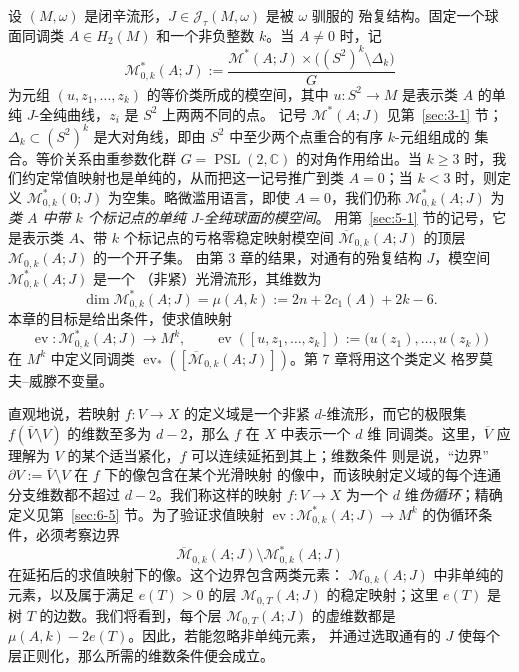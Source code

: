 
设 $(M,\omega)$ 是闭辛流形，$J\in\mathcal J_\tau(M,\omega)$ 是被 $\omega$ 驯服的
殆复结构。固定一个球面同调类 $A\in H_2(M)$ 和一个非负整数 $k$。当 $A\ne0$ 时，记
\[
  \mathcal M^*_{0,k}(A;J)
  :=\frac{\mathcal M^*(A;J)\times\bigl((S^2)^k\setminus\Delta_k\bigr)}{G}
\]
为元组 $(u,z_1,\ldots,z_k)$ 的等价类所成的模空间，其中
$u:S^2\to M$ 是表示类 $A$ 的单纯 $J$-全纯曲线，$z_i$ 是 $S^2$ 上两两不同的点。
记号 $\mathcal M^*(A;J)$ 见第~\ref{sec:3-1} 节；
$\Delta_k\subset(S^2)^k$ 是大对角线，即由 $S^2$ 中至少两个点重合的有序 $k$-元组组成的
集合。等价关系由重参数化群 $G=\operatorname{PSL}(2,\mathbb C)$ 的对角作用给出。当
$k\ge3$ 时，我们约定常值映射也是单纯的，从而把这一记号推广到类 $A=0$；当 $k<3$
时，则定义 $\mathcal M^*_{0,k}(0;J)$ 为空集。略微滥用语言，即使 $A=0$，我们仍称
$\mathcal M^*_{0,k}(A;J)$ 为\emph{类 $A$ 中带 $k$ 个标记点的单纯 $J$-全纯球面的模空间}。
用第~\ref{sec:5-1} 节的记号，它是表示类 $A$、带 $k$ 个标记点的亏格零稳定映射模空间
$\overline{\mathcal M}_{0,k}(A;J)$ 的顶层 $\mathcal M_{0,k}(A;J)$ 的一个开子集。
由第 3 章的结果，对通有的殆复结构 $J$，模空间 $\mathcal M^*_{0,k}(A;J)$ 是一个
（非紧）光滑流形，其维数为
\[
  \dim\mathcal M^*_{0,k}(A;J)
  =\mu(A,k):=2n+2c_1(A)+2k-6.
\]
本章的目标是给出条件，使求值映射
\[
  \operatorname{ev}:\mathcal M^*_{0,k}(A;J)\longrightarrow M^k,
  \qquad
  \operatorname{ev}([u,z_1,\ldots,z_k])
  :=\bigl(u(z_1),\ldots,u(z_k)\bigr)
\]
在 $M^k$ 中定义同调类
$\operatorname{ev}_*([\overline{\mathcal M}_{0,k}(A;J)])$。第 7 章将用这个类定义
格罗莫夫--威滕不变量。

直观地说，若映射 $f:V\to X$ 的定义域是一个非紧 $d$-维流形，而它的极限集
$f(\overline V\setminus V)$ 的维数至多为 $d-2$，那么 $f$ 在 $X$ 中表示一个 $d$ 维
同调类。这里，$\overline V$ 应理解为 $V$ 的某个适当紧化，$f$ 可以连续延拓到其上；维数条件
则是说，“边界” $\partial V:=\overline V\setminus V$ 在 $f$ 下的像包含在某个光滑映射
的像中，而该映射定义域的每个连通分支维数都不超过 $d-2$。我们称这样的映射
$f:V\to X$ 为一个 $d$ 维\emph{伪循环}；精确定义见第~\ref{sec:6-5} 节。为了验证求值映射
$\operatorname{ev}:\mathcal M^*_{0,k}(A;J)\to M^k$ 的伪循环条件，必须考察边界
\[
  \overline{\mathcal M}_{0,k}(A;J)\setminus\mathcal M^*_{0,k}(A;J)
\]
在延拓后的求值映射下的像。这个边界包含两类元素：
$\mathcal M_{0,k}(A;J)$ 中非单纯的元素，以及属于满足 $e(T)>0$ 的层
$\mathcal M_{0,T}(A;J)$ 的稳定映射；这里 $e(T)$ 是树 $T$ 的边数。我们将看到，每个层
$\mathcal M_{0,T}(A;J)$ 的虚维数都是 $\mu(A,k)-2e(T)$。因此，若能忽略非单纯元素，
并通过选取通有的 $J$ 使每个层正则化，那么所需的维数条件便会成立。


